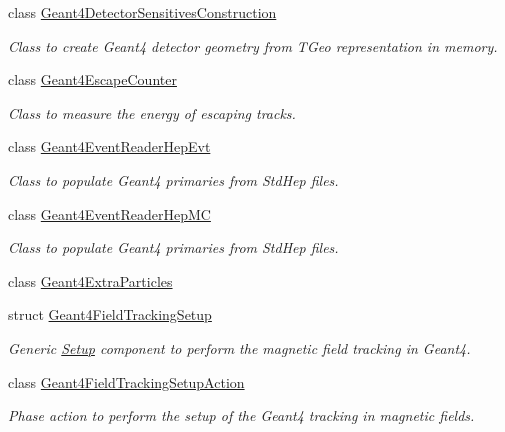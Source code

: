 \begin{DoxyCompactItemize}
class \hyperlink{class_d_d4hep_1_1_simulation_1_1_geant4_detector_sensitives_construction}{Geant4DetectorSensitivesConstruction}
\begin{DoxyCompactList}\small\item\em Class to create Geant4 detector geometry from TGeo representation in memory. \item\end{DoxyCompactList}\item 
class \hyperlink{class_d_d4hep_1_1_simulation_1_1_geant4_escape_counter}{Geant4EscapeCounter}
\begin{DoxyCompactList}\small\item\em Class to measure the energy of escaping tracks. \item\end{DoxyCompactList}\item 
class \hyperlink{class_d_d4hep_1_1_simulation_1_1_geant4_event_reader_hep_evt}{Geant4EventReaderHepEvt}
\begin{DoxyCompactList}\small\item\em Class to populate Geant4 primaries from StdHep files. \item\end{DoxyCompactList}\item 
class \hyperlink{class_d_d4hep_1_1_simulation_1_1_geant4_event_reader_hep_m_c}{Geant4EventReaderHepMC}
\begin{DoxyCompactList}\small\item\em Class to populate Geant4 primaries from StdHep files. \item\end{DoxyCompactList}\item 
class \hyperlink{class_d_d4hep_1_1_simulation_1_1_geant4_extra_particles}{Geant4ExtraParticles}
\item 
struct \hyperlink{struct_d_d4hep_1_1_simulation_1_1_geant4_field_tracking_setup}{Geant4FieldTrackingSetup}
\begin{DoxyCompactList}\small\item\em Generic \hyperlink{namespace_d_d4hep_1_1_simulation_1_1_setup}{Setup} component to perform the magnetic field tracking in Geant4. \item\end{DoxyCompactList}\item 
class \hyperlink{class_d_d4hep_1_1_simulation_1_1_geant4_field_tracking_setup_action}{Geant4FieldTrackingSetupAction}
\begin{DoxyCompactList}\small\item\em Phase action to perform the setup of the Geant4 tracking in magnetic fields. \item\end{DoxyCompactList}\item 

\end{DoxyCompactItemize}
